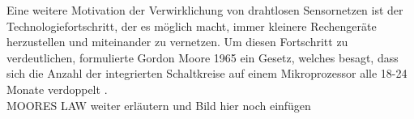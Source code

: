 Eine weitere Motivation der Verwirklichung von drahtlosen Sensornetzen ist der Technologiefortschritt, der es möglich macht, immer kleinere Rechengeräte herzustellen und miteinander zu vernetzen. Um diesen Fortschritt zu verdeutlichen, formulierte Gordon Moore 1965 ein Gesetz, welches besagt, dass sich die Anzahl der integrierten Schaltkreise auf einem Mikroprozessor alle 18-24 Monate verdoppelt \cite{d:wolf}. \\

MOORES LAW weiter erläutern und Bild hier noch einfügen
